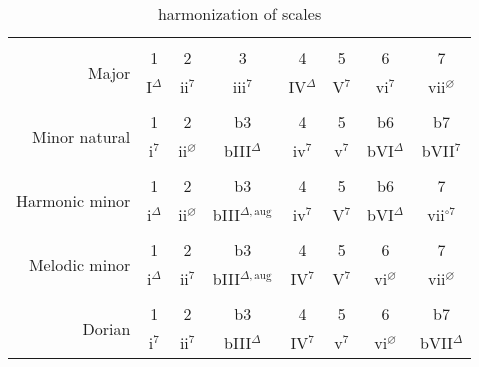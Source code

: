 
\begin{table*}[!h]
	\caption{harmonization of scales}
	\begin{adjustwidth}{0cm}{}
	\begin{tabular}{r|ccc cccc}
		\hline \vspace{-0.4cm} \\
		\multirow{2}{*}{Major}          & 1 & 2 & 3 & 4 & 5 & 6 & 7\\
		                                & I$^\Delta$ & ii$^{7}$ & iii$^{7}$ & IV$^\Delta$ & V$^7$ & vi$^{7}$ & vii$^{\varnothing}$ \\
		\hline \vspace{-0.2cm} \\
		\multirow{2}{*}{Minor natural} & 1 & 2 & b3 & 4 & 5 & b6 & b7\\
		                                & i$^7$ & ii$^{\varnothing}$ & bIII$^{\Delta}$ & iv$^7$ & v$^7$ & bVI$^{\Delta}$ & bVII$^{7}$ \\
		\hline \vspace{-0.2cm} \\
		\multirow{2}{*}{Harmonic minor} & 1 & 2 & b3 & 4 & 5 & b6 & 7\\
		                                & i$^{\Delta}$ & ii$^{\varnothing}$ & bIII$^{\Delta, \textrm{aug}}$ & iv$^7$ & V$^7$ & bVI$^{\Delta}$ & vii$^{\circ 7}$ \\
		\hline \vspace{-0.2cm} \\
		\multirow{2}{*}{Melodic minor} & 1 & 2 & b3 & 4 & 5 & 6 & 7\\
			                           & i$^{\Delta}$ & ii$^{7}$ & bIII$^{\Delta, \textrm{aug}}$ & IV$^7$ & V$^7$ & vi$^{\varnothing}$ & vii$^{\varnothing}$ \\
			                           \hline \vspace{-0.2cm} \\
		\multirow{2}{*}{Dorian}        & 1 & 2 & b3 & 4 & 5 & 6 & b7\\
			                           & i$^{7}$ & ii$^{7}$ & bIII$^{\Delta}$ & IV$^7$ & v$^7$ & vi$^{\varnothing}$ & bVII$^{\Delta}$ \\
		\hline
	\end{tabular}
	\label{tab: }
	\end{adjustwidth}
\end{table*}
